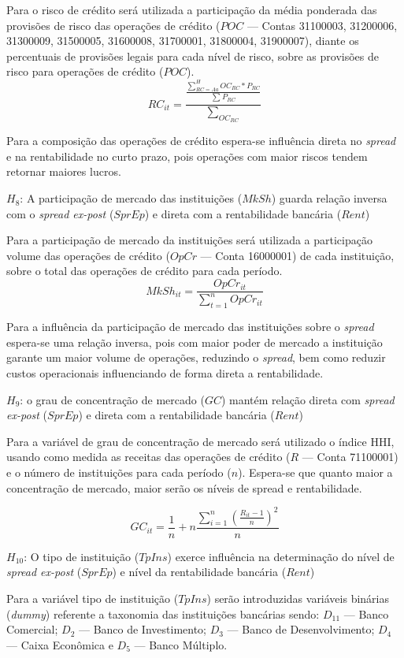\documentclass[12pt,12pt,openright,oneside,a4paper,chapter=TITLE,section=TITLE,subsection=TITLE,subsubsection=TITLE,english,french,spanish,portugues,sumario=tradicional]{abntex2}
\begin{document}
Para o risco de crédito será utilizada a participação da média ponderada das provisões de risco das operações de crédito (\(POC\) --- Contas 31100003, 31200006, 31300009, 31500005, 31600008, 31700001, 31800004, 31900007), diante os percentuais de provisões legais para cada nível de risco, sobre as provisões de risco para operações de crédito (\(POC\)).
\[
RC_{it} = \frac{\frac{\sum_{RC = Aa}^HOC_{RC}*P_{RC}}{\sum_{}P_{RC}}}{\sum_{OC_{RC}}}
\]

Para a composição das operações de crédito espera-se influência direta no \emph{spread} e na rentabilidade no curto prazo, pois operações com maior riscos tendem retornar maiores lucros.

\(H_{8}\): A participação de mercado das instituições (\(MkSh\)) guarda relação inversa com o \emph{spread ex-post} (\(SprEp\)) e direta com a rentabilidade bancária (\(Rent\))

Para a participação de mercado da instituições será utilizada a participação volume das operações de crédito (\(OpCr\) --- Conta 16000001) de cada instituição, sobre o total das operações de crédito para cada período.
\[
MkSh_{it} = \frac{OpCr_{it}}{\sum_{t=1}^nOpCr_{it}}
\]

Para a influência da participação de mercado das instituições sobre o \emph{spread} espera-se uma relação inversa, pois com maior poder de mercado a instituição garante um maior volume de operações, reduzindo o \emph{spread}, bem como reduzir custos operacionais influenciando de forma direta a rentabilidade.

\(H_{9}\): o grau de concentração de mercado (\(GC\)) mantém relação direta com \emph{spread ex-post} (\(SprEp\)) e direta com a rentabilidade bancária (\(Rent\))

Para a variável de grau de concentração de mercado será utilizado o índice HHI, usando como medida as receitas das operações de crédito (\(R\) --- Conta 71100001) e o número de instituições para cada período (\(n\)). Espera-se que quanto maior a concentração de mercado, maior serão os níveis de spread e rentabilidade.

\[
GC_{it} = \frac{1}{n} + n\frac{\sum_{i=1}^{n}(\frac{R_{it} - 1}{n})^2}{n}
\]

\(H_{10}\): O tipo de instituição (\(TpIns\)) exerce influência na determinação do nível de \emph{spread ex-post} (\(SprEp\)) e nível da rentabilidade bancária (\(Rent\))

Para a variável tipo de instituição (\(TpIns\)) serão introduzidas variáveis binárias (\emph{dummy}) referente a taxonomia das instituições bancárias sendo: \(D_{11}\) --- Banco Comercial; \(D_{2}\) --- Banco de Investimento; \(D_{3}\) --- Banco de Desenvolvimento; \(D_{4}\) --- Caixa Econômica e \(D_{5}\) --- Banco Múltiplo.
\end{document}
